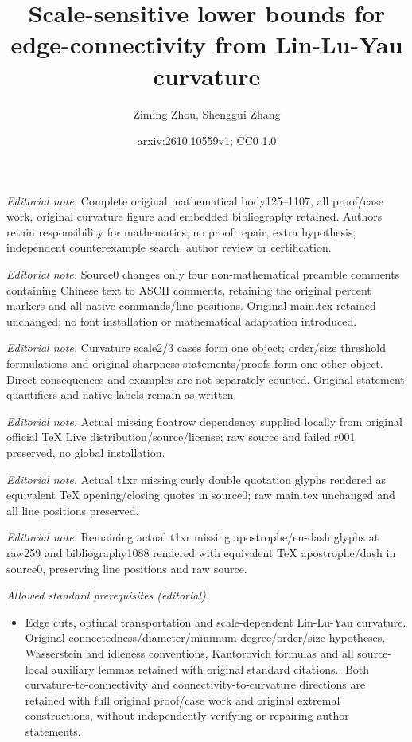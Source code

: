 \documentclass[10pt,a4paper]{article}
\title{Scale-sensitive lower bounds for edge-connectivity from Lin-Lu-Yau curvature}
\author{Ziming Zhou, Shenggui Zhang}
\date{arxiv:2610.10559v1; CC0 1.0}
\theoremstyle{definition}
\theoremstyle{definition}
\theoremstyle{nonumber}
\begin{document}
\maketitle
\noindent\textit{Editorial note.} Complete original mathematical body125--1107, all proof/case work, original curvature figure and embedded bibliography retained. Authors retain responsibility for mathematics; no proof repair, extra hypothesis, independent counterexample search, author review or certification.\par\medskip
\noindent\textit{Editorial note.} Source0 changes only four non-mathematical preamble comments containing Chinese text to ASCII comments, retaining the original percent markers and all native commands/line positions. Original main.tex retained unchanged; no font installation or mathematical adaptation introduced.\par\medskip
\noindent\textit{Editorial note.} Curvature scale2/3 cases form one object; order/size threshold formulations and original sharpness statements/proofs form one other object. Direct consequences and examples are not separately counted. Original statement quantifiers and native labels remain as written.\par\medskip
\noindent\textit{Editorial note.} Actual missing floatrow dependency supplied locally from original official TeX Live distribution/source/license; raw source and failed r001 preserved, no global installation.\par\medskip
\noindent\textit{Editorial note.} Actual t1xr missing curly double quotation glyphs rendered as equivalent TeX opening/closing quotes in source0; raw main.tex unchanged and all line positions preserved.\par\medskip
\noindent\textit{Editorial note.} Remaining actual t1xr missing apostrophe/en-dash glyphs at raw259 and bibliography1088 rendered with equivalent TeX apostrophe/dash in source0, preserving line positions and raw source.\par\medskip
\noindent\textit{Allowed standard prerequisites (editorial).}\begin{itemize}
\item Edge cuts, optimal transportation and scale-dependent Lin-Lu-Yau curvature. Original connectedness/diameter/minimum degree/order/size hypotheses, Wasserstein and idleness conventions, Kantorovich formulas and all source-local auxiliary lemmas retained with original standard citations.. Both curvature-to-connectivity and connectivity-to-curvature directions are retained with full original proof/case work and original extremal constructions, without independently verifying or repairing author statements.
\end{itemize}\medskip
\end{document}
